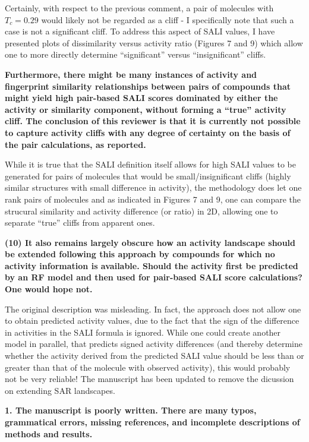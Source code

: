 \documentclass[letterpaper, 12pt]{article}
\begin{document}
Certainly, with respect to the previous comment, a pair of molecules with $T_c = 0.29$ would likely
not be regarded as a cliff - I specifically note that such a case is not a significant cliff. To
address this aspect of SALI values, I have presented plots of dissimilarity versus activity ratio
(Figures 7 and 9) which allow one to more directly determine ``significant'' versus
``insignificant'' cliffs.

\textbf{Furthermore, there might be many instances of activity and fingerprint similarity
  relationships between pairs of compounds that might yield high pair-based SALI scores dominated by
  either the activity or similarity component, without forming a “true” activity cliff. The
  conclusion of this reviewer is that it is currently not possible to capture activity cliffs with
  any degree of certainty on the basis of the pair calculations, as reported.}

While it is true that the SALI definition itself allows for high SALI values to be generated for
pairs of molecules that would be small/insignificant cliffs (highly similar structures with small
difference in activity), the methodology does let one rank pairs of molecules and as indicated in
Figures 7 and 9, one can compare the strucural similarity and activity difference (or ratio) in 2D,
allowing one to separate ``true'' cliffs from apparent ones.

\textbf{(10) It also remains largely obscure how an activity landscape should be extended following
  this approach by compounds for which no activity information is available. Should the activity
  first be predicted by an RF model and then used for pair-based SALI score calculations?  One would
  hope not.}

The original description was misleading. In fact, the approach does not allow one to obtain
predicted activity values, due to the fact that the sign of the difference in activities in the SALI
formula is ignored. While one could create another model in parallel, that predicts signed activity
differences (and thereby determine whether the activity derived from the predicted SALI value should
be less than or greater than that of the molecule with observed activity), this would probably not
be very reliable! The manuscript has been updated to remove the dicussion on extending SAR
landscapes.


\textbf{1.  The manuscript is poorly written.  There are many typos, grammatical errors, missing
  references, and incomplete descriptions of methods and results.}
\end{document}

